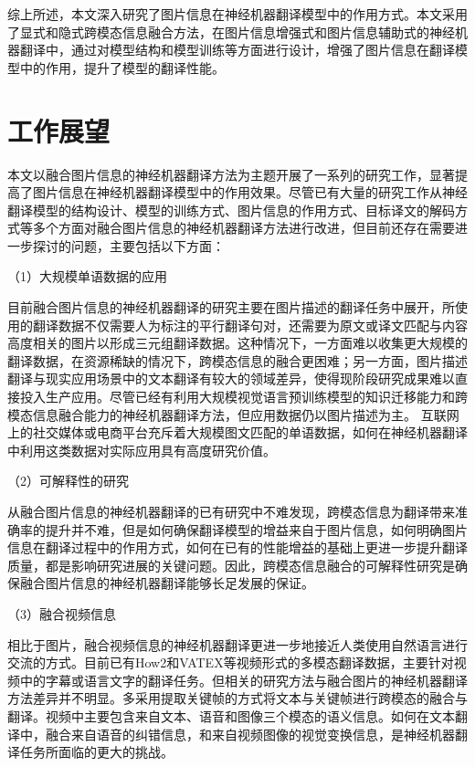 综上所述，本文深入研究了图片信息在神经机器翻译模型中的作用方式。本文采用了显式和隐式跨模态信息融合方法，在图片信息增强式和图片信息辅助式的神经机器翻译中，通过对模型结构和模型训练等方面进行设计，增强了图片信息在翻译模型中的作用，提升了模型的翻译性能。



\section{工作展望}

本文以融合图片信息的神经机器翻译方法为主题开展了一系列的研究工作，显著提高了图片信息在神经机器翻译模型中的作用效果。尽管已有大量的研究工作从神经翻译模型的结构设计、模型的训练方式、图片信息的作用方式、目标译文的解码方式等多个方面对融合图片信息的神经机器翻译方法进行改进，但目前还存在需要进一步探讨的问题，主要包括以下方面：

（1）大规模单语数据的应用

目前融合图片信息的神经机器翻译的研究主要在图片描述的翻译任务中展开，所使用的翻译数据不仅需要人为标注的平行翻译句对，还需要为原文或译文匹配与内容高度相关的图片以形成三元组翻译数据。这种情况下，一方面难以收集更大规模的翻译数据，在资源稀缺的情况下，跨模态信息的融合更困难；另一方面，图片描述翻译与现实应用场景中的文本翻译有较大的领域差异，使得现阶段研究成果难以直接投入生产应用。尽管已经有利用大规模视觉语言预训练模型的知识迁移能力和跨模态信息融合能力的神经机器翻译方法，但应用数据仍以图片描述为主。
互联网上的社交媒体或电商平台充斥着大规模图文匹配的单语数据，如何在神经机器翻译中利用这类数据对实际应用具有高度研究价值。

（2）可解释性的研究

从融合图片信息的神经机器翻译的已有研究中不难发现，跨模态信息为翻译带来准确率的提升并不难，但是如何确保翻译模型的增益来自于图片信息，如何明确图片信息在翻译过程中的作用方式，如何在已有的性能增益的基础上更进一步提升翻译质量，都是影响研究进展的关键问题。因此，跨模态信息融合的可解释性研究是确保融合图片信息的神经机器翻译能够长足发展的保证。

（3）融合视频信息

相比于图片，融合视频信息的神经机器翻译更进一步地接近人类使用自然语言进行交流的方式。目前已有How2和VATEX等视频形式的多模态翻译数据，主要针对视频中的字幕或语言文字的翻译任务。但相关的研究方法与融合图片的神经机器翻译方法差异并不明显。多采用提取关键帧的方式将文本与关键帧进行跨模态的融合与翻译。视频中主要包含来自文本、语音和图像三个模态的语义信息。如何在文本翻译中，融合来自语音的纠错信息，和来自视频图像的视觉变换信息，是神经机器翻译任务所面临的更大的挑战。
